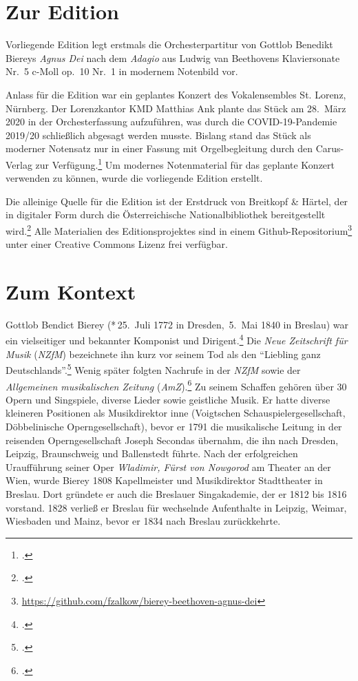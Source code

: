 \documentclass[paper=A3,12pt]{scrartcl}
\begin{document}
\thispagestyle{empty}

\section{Zur Edition}

Vorliegende Edition legt erstmals die Orchesterpartitur von Gottlob Benedikt Biereys \textit{Agnus Dei} nach dem \textit{Adagio} aus Ludwig van Beethovens Klaviersonate Nr.~5 c-Moll op.~10 Nr.~1 in modernem Notenbild vor.\medskip

Anlass für die Edition war ein geplantes Konzert des Vokalensembles St. Lorenz, Nürnberg.
Der Lorenzkantor KMD Matthias Ank plante das Stück am 28.\ März 2020 in der Orchesterfassung aufzuführen, was durch die COVID-19-Pandemie 2019/20 schließlich abgesagt werden musste.
Bislang stand das Stück als moderner Notensatz nur in einer Fassung mit Orgelbegleitung durch den Carus-Verlag zur Verfügung.\footcite{2018_Schumacher_AgnusDei_Carus}
Um modernes Notenmaterial für das geplante Konzert verwenden zu können, wurde die vorliegende Edition erstellt.\medskip

Die alleinige Quelle für die Edition ist der Erstdruck von Breitkopf \& Härtel, der in digitaler Form durch die Österreichische Nationalbibliothek bereitgestellt wird.\footcite{Bierey_AgnusDei_Breitkopf}
Alle Materialien des Editionsprojektes sind in einem Github-Repositorium\footnote{\url{https://github.com/fzalkow/bierey-beethoven-agnus-dei}} unter einer Creative Commons Lizenz frei verfügbar.

\section{Zum Kontext}

Gottlob Bendict Bierey (*\,25.\ Juli 1772 in Dresden, \textdagger\,5.\ Mai 1840 in Breslau)
war ein vielseitiger und bekannter Komponist und Dirigent.\footcite{2016_Haertwig_Bierey_MGG}
Die \textit{Neue Zeitschrift für Musik} (\textit{NZfM}) bezeichnete ihn kurz vor seinem Tod als den \enquote{Liebling ganz Deutschlands}.\footcite{1840_NA_Nachkommenschaft_NZFM}
Wenig später folgten Nachrufe in der \textit{NZfM} sowie der \textit{Allgemeinen musikalischen Zeitung} (\textit{AmZ}).\footcite{1840_NA_BiereyNachruf_NZFM,1840_NA_BiereyNachruf_AMZ}
Zu seinem Schaffen gehören über 30 Opern und Singspiele, diverse Lieder sowie geistliche Musik.
%
Er hatte diverse kleineren Positionen als Musikdirektor inne (Voigtschen Schauspielergesellschaft, Döbbelinische Operngesellschaft),
bevor er 1791 die musikalische Leitung in der reisenden Operngesellschaft Joseph Secondas übernahm, die ihn nach Dresden, Leipzig, Braunschweig und Ballenstedt führte.
Nach der erfolgreichen Uraufführung seiner Oper \textit{Wladimir, Fürst von Nowgorod} am Theater an der Wien, wurde Bierey 1808  Kapellmeister und Musikdirektor Stadttheater in Breslau.
Dort gründete er auch die Breslauer Singakademie, der er 1812 bis 1816 vorstand.
1828 verließ er Breslau für wechselnde Aufenthalte in Leipzig, Weimar, Wiesbaden und Mainz, bevor er 1834 nach Breslau zurückkehrte.
\end{document}
